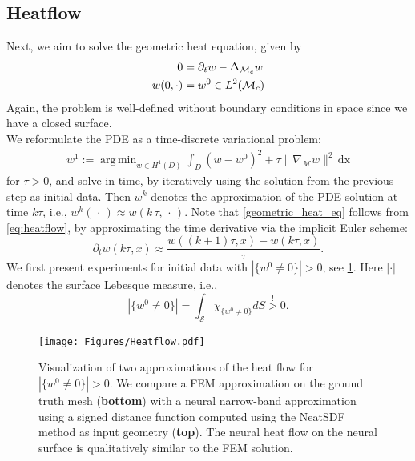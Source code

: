 \documentclass[12pt,openany]{book}
\theoremstyle{plainnormal}
\theoremstyle{remark}
\DeclareMathOperator*{\argmin}{arg\,min}
\begin{document}
\subsection{Heatflow}\label{section_heatflow}
Next, we aim to solve the geometric heat equation, given by
\begin{align}\label{eq:heatflow}
    0 &= \partial_t w - \Delta_{\mathcal{M}_c} w \\
    w(0,\cdot) &= w^0 \in L^2(\mathcal{M}_c)  \notag
\end{align}
Again, the problem is well-defined without boundary conditions in space since we have a closed surface.\\
We reformulate the PDE as a time-discrete variational problem:
\begin{align}\label{geometric_heat_eq}
    w^{1} := \argmin_{w\in H^1(D)}\int_D (w - w^0)^2 + \tau \|\nabla_{\mathcal{M}}w\|^2 \,\mathrm{dx}
\end{align} for $\tau > 0 $, and solve in time, by iteratively using the solution from the previous step as initial data. Then $w^k$ denotes the approximation of the PDE solution at time $k\tau$, i.e., $w^k(\,\cdot\,) \approx w(k\,\tau, \,\cdot\,)$. Note that \cref{geometric_heat_eq} follows from \cref{eq:heatflow}, by approximating the time derivative via the implicit Euler scheme:  $$\partial_t w(k\tau, x) \approx \frac{w((k+1)\tau, x) - w(k\tau, x)}{\tau}. $$
We first present experiments for initial data with $|\{w^0 \neq0\}| >0$, see \cref{comp_beethoven}. Here $|\cdot|$ denotes the surface Lebesque measure, i.e., $$|\{w^0 \neq0\}| = \int_\mathcal{S} \chi_{\{w^0 \neq 0\}} dS \overset{!}{>} 0.$$
\begin{figure}
    \centering    
    \texttt{[image: Figures/Heatflow.pdf]}
\caption{Visualization of two approximations of the heat flow for $|\{w^0 \neq0\}| >0$. We compare a FEM approximation on the ground truth mesh (\textbf{bottom}) with a neural narrow-band approximation using a signed distance function computed using the NeatSDF method as input geometry (\textbf{top}). The neural heat flow on the neural surface is qualitatively similar to the FEM solution.}\label{comp_beethoven}
\end{figure}
\end{document}
